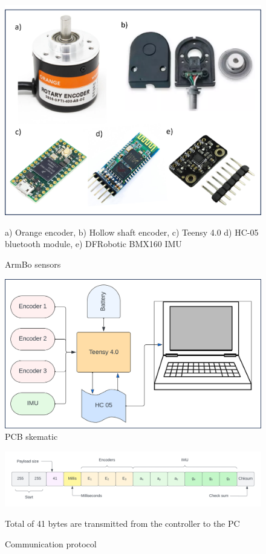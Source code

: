\documentclass[12pt, twoside]{report}
\begin{document}
\begin{figure}[hbt!]
    \centering
    \includegraphics[width=\textwidth]{m_controller.png}
    \caption{ArmBo sensors}
    {a) Orange encoder, b) Hollow shaft encoder, c) Teensy 4.0
        d) HC-05 bluetooth module, e) DFRobotic BMX160 IMU
    }
    \label{fig:controller}
\end{figure}


\begin{figure}[hbt!]
    \centering
    \includegraphics[width=\textwidth]{m_pcb_skematic.png}
    \caption{PCB skematic}
    \label{fig:pcb}
\end{figure}


\begin{figure}[hbt!]
    \centering
    \includegraphics[width=\textwidth]{m_jedi.png}
    \caption{Communication protocol}
    {Total of 41 bytes are transmitted from the controller to the PC}
    \label{fig:jedi}
\end{figure}
\end{document}
